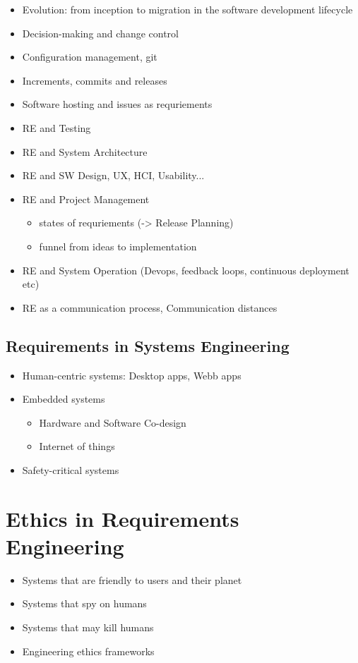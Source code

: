 \begin{itemize}
  \item Evolution: from inception to migration in the software development lifecycle
  \item Decision-making and change control
  \item Configuration management, git
  \item Increments, commits and releases
  \item Software hosting and issues as requriements
  \item RE and Testing
  \item RE and System Architecture
  \item RE and SW Design, UX, HCI, Usability...
  \item RE and Project Management
  \begin{itemize}
    \item states of requriements (-> Release Planning)
    \item funnel from ideas to implementation
  \end{itemize}
   \item RE and System Operation (Devops, feedback loops, continuous deployment etc)
   \item RE as a communication process, Communication distances
\end{itemize}

\subsection{Requirements in Systems Engineering}

\begin{itemize}
  \item Human-centric systems: Desktop apps, Webb apps
  \item Embedded systems
  \begin{itemize}
    \item Hardware and Software Co-design
    \item Internet of things
  \end{itemize}
  \item Safety-critical systems
\end{itemize}

\section{Ethics in Requirements Engineering}

\begin{itemize}
  \item Systems that are friendly to users and their planet
  \item Systems that spy on humans
  \item Systems that may kill humans
  \item Engineering ethics frameworks
\end{itemize}

